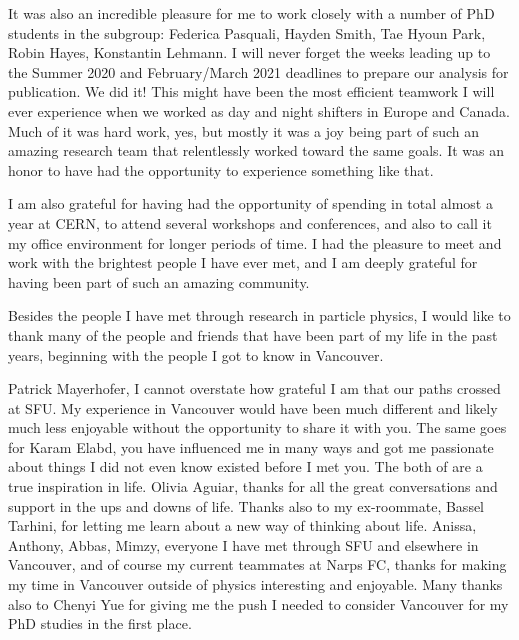 It was also an incredible pleasure for me to work closely with a number of PhD students in the \HWW subgroup: 
Federica Pasquali, Hayden Smith, Tae Hyoun Park, Robin Hayes, Konstantin Lehmann. 
I will never forget the weeks leading up to the Summer 2020 and February/March 2021 deadlines to prepare our analysis for publication. We did it!
This might have been the most efficient teamwork I will ever experience when we worked as day and night shifters in Europe and Canada. 
Much of it was hard work, yes, but mostly it was a joy being part of such an amazing research team that relentlessly worked toward the same goals. It was an honor to have had the opportunity to experience something like that. 

I am also grateful for having had the opportunity of spending in total almost a year at CERN, to attend several workshops and conferences, and also to call it my office environment for longer periods of time. 
I had the pleasure to meet and work with the brightest people I have ever met, and I am deeply grateful for having been part of such an amazing community. 

Besides the people I have met through research in particle physics, I would like to thank many of the people and friends that have been part of my life in the past years, beginning with the people I got to know in Vancouver. 

Patrick Mayerhofer, I cannot overstate how grateful I am that our paths crossed at SFU. My experience in Vancouver would have been much different and likely much less enjoyable without the opportunity to share it with you.
The same goes for Karam Elabd, you have influenced me in many ways and got me passionate about things I did not even know existed before I met you. The both of are a true inspiration in life.
Olivia Aguiar, thanks for all the great conversations and support in the ups and downs of life. 
Thanks also to my ex-roommate, Bassel Tarhini, for letting me learn about a new way of thinking about life. 
Anissa, Anthony, Abbas, Mimzy, everyone I have met through SFU and elsewhere in Vancouver, and of course my current teammates at Narps FC, thanks for making my time in Vancouver outside of physics interesting and enjoyable. 
Many thanks also to Chenyi Yue for giving me the push I needed to consider Vancouver for my PhD studies in the first place. 

